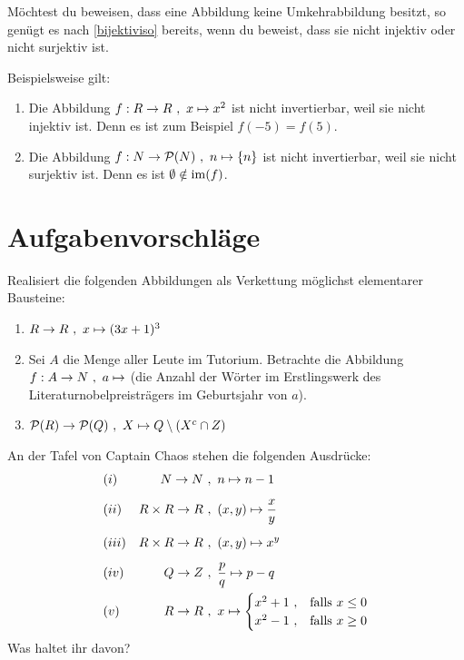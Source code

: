 \begin{bem} \label{invwiderleg}
    Möchtest du beweisen, dass eine Abbildung keine Umkehrabbildung besitzt, so genügt es nach \cref{bijektiviso} bereits, wenn du beweist, dass sie nicht injektiv oder nicht surjektiv ist.
\end{bem}


\begin{bsp}
    Beispielsweise gilt:
    \begin{enumerate}
        \item Die Abbildung $f : \R \to \R \ ,\ x\mapsto x^2$ ist nicht invertierbar, weil sie nicht injektiv ist. Denn es ist zum Beispiel $f(-5)=f(5)$.
        \item Die Abbildung $f : \N \to \calP(\N) \ ,\ n \mapsto \{n\}$ ist nicht invertierbar, weil sie nicht surjektiv ist. Denn es ist $\emptyset \notin \operatorname{im}(f)$.
    \end{enumerate}
\end{bsp}





\clearpage
\section{Aufgabenvorschläge}


\begin{aufg}
    Realisiert die folgenden Abbildungen als Verkettung möglichst elementarer Bausteine:
    \begin{enumerate}
        \item $\relax R\to \relax R \ ,\ x\mapsto (3x+1)^3$
        \item Sei $A$ die Menge aller Leute im Tutorium. Betrachte die Abbildung $f:A\to \relax N \ ,\ a\mapsto$ (die Anzahl der Wörter im Erstlingswerk des Literaturnobelpreisträgers im Geburtsjahr von $a$).
        \item $\mathcal P(\relax R) \to \mathcal P(\relax Q) \ ,\ X \mapsto \relax Q \setminus (X^c\cap \relax Z)$
    \end{enumerate}
\end{aufg}


\begin{aufg}[Wohldefiniertheit] \label{aufg:wohldef}
    An der Tafel von Captain Chaos stehen die folgenden Ausdrücke:
    \begin{align*}
        & (i) & \relax N \to \relax N\ &,\ n \mapsto n-1 \\[0.5em]
        & (ii) & \relax R\times \relax R \to \relax R \ &,\ (x,y) \mapsto \frac{x}{y} \\[0.5em]
        & (iii) & \relax R \times \relax R \to \relax R \ &,\ (x,y) \mapsto x^y \\[0.5em]
        & (iv) & \relax Q \to \relax Z \ &,\ \frac{p}{q} \mapsto p-q \\
        & (v) & \relax R \to \relax R \ &,\ x \mapsto \begin{cases}
            x^2+1\ , & \text{falls}\ x \le 0 \\
            x^2-1\ , & \text{falls}\ x\ge 0
        \end{cases}
    \end{align*}
    Was haltet ihr davon?
\end{aufg}


